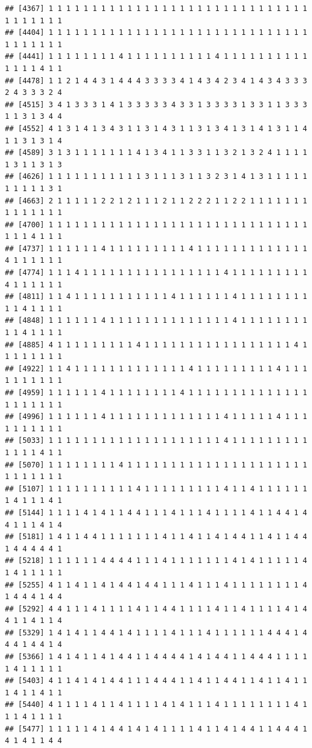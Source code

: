 \documentclass[
]{article}
\begin{document}
\begin{verbatim}
## [4367] 1 1 1 1 1 1 1 1 1 1 1 1 1 1 1 1 1 1 1 1 1 1 1 1 1 1 1 1 1 1 1 1 1 1 1 1 1
## [4404] 1 1 1 1 1 1 1 1 1 1 1 1 1 1 1 1 1 1 1 1 1 1 1 1 1 1 1 1 1 1 1 1 1 1 1 1 1
## [4441] 1 1 1 1 1 1 1 1 4 1 1 1 1 1 1 1 1 1 1 4 1 1 1 1 1 1 1 1 1 1 1 1 1 1 4 1 1
## [4478] 1 1 2 1 4 4 3 1 4 4 4 3 3 3 3 4 1 4 3 4 2 3 4 1 4 3 4 3 3 3 2 4 3 3 3 2 4
## [4515] 3 4 1 3 3 3 1 4 1 3 3 3 3 3 4 3 3 1 3 3 3 3 1 3 3 1 1 3 3 3 1 1 3 1 3 4 4
## [4552] 4 1 3 1 4 1 3 4 3 1 1 3 1 4 3 1 1 3 1 3 4 1 3 1 4 1 3 1 1 4 1 1 3 1 3 1 4
## [4589] 3 1 3 1 1 1 1 1 1 1 4 1 3 4 1 1 3 3 1 1 3 2 1 3 2 4 1 1 1 1 1 3 1 1 3 1 3
## [4626] 1 1 1 1 1 1 1 1 1 1 1 3 1 1 1 3 1 1 3 2 3 1 4 1 3 1 1 1 1 1 1 1 1 1 1 3 1
## [4663] 2 1 1 1 1 1 2 2 1 2 1 1 1 2 1 1 2 2 2 1 1 2 2 1 1 1 1 1 1 1 1 1 1 1 1 1 1
## [4700] 1 1 1 1 1 1 1 1 1 1 1 1 1 1 1 1 1 1 1 1 1 1 1 1 1 1 1 1 1 1 1 1 1 4 1 1 1
## [4737] 1 1 1 1 1 1 4 1 1 1 1 1 1 1 1 1 4 1 1 1 1 1 1 1 1 1 1 1 1 1 4 1 1 1 1 1 1
## [4774] 1 1 1 4 1 1 1 1 1 1 1 1 1 1 1 1 1 1 1 1 4 1 1 1 1 1 1 1 1 1 4 1 1 1 1 1 1
## [4811] 1 1 4 1 1 1 1 1 1 1 1 1 1 1 4 1 1 1 1 1 1 4 1 1 1 1 1 1 1 1 1 1 4 1 1 1 1
## [4848] 1 1 1 1 1 1 4 1 1 1 1 1 1 1 1 1 1 1 1 1 1 4 1 1 1 1 1 1 1 1 1 1 4 1 1 1 1
## [4885] 4 1 1 1 1 1 1 1 1 1 4 1 1 1 1 1 1 1 1 1 1 1 1 1 1 1 1 1 4 1 1 1 1 1 1 1 1
## [4922] 1 1 4 1 1 1 1 1 1 1 1 1 1 1 1 1 4 1 1 1 1 1 1 1 1 1 4 1 1 1 1 1 1 1 1 1 1
## [4959] 1 1 1 1 1 1 4 1 1 1 1 1 1 1 1 4 1 1 1 1 1 1 1 1 1 1 1 1 1 1 1 1 1 1 1 1 1
## [4996] 1 1 1 1 1 1 4 1 1 1 1 1 1 1 1 1 1 1 1 1 4 1 1 1 1 1 4 1 1 1 1 1 1 1 1 1 1
## [5033] 1 1 1 1 1 1 1 1 1 1 1 1 1 1 1 1 1 1 1 1 4 1 1 1 1 1 1 1 1 1 1 1 1 1 4 1 1
## [5070] 1 1 1 1 1 1 1 1 4 1 1 1 1 1 1 1 1 1 1 1 1 1 1 1 1 1 1 1 1 1 1 1 1 1 1 1 1
## [5107] 1 1 1 1 1 1 1 1 1 1 4 1 1 1 1 1 1 1 1 1 4 1 1 4 1 1 1 1 1 1 1 4 1 1 1 4 1
## [5144] 1 1 1 1 4 1 4 1 1 4 4 1 1 1 4 1 1 1 4 1 1 1 1 4 1 1 4 4 1 4 4 1 1 1 4 1 4
## [5181] 1 4 1 1 4 4 1 1 1 1 1 1 1 4 1 1 4 1 1 4 1 4 4 1 1 4 1 1 4 4 1 4 4 4 4 4 1
## [5218] 1 1 1 1 1 1 4 4 4 4 1 1 1 4 1 1 1 1 1 1 1 4 1 4 1 1 1 1 1 4 1 4 1 1 1 1 1
## [5255] 4 1 1 4 1 1 4 1 4 4 1 4 4 1 1 1 4 1 1 1 4 1 1 1 1 1 1 1 1 4 1 4 4 4 1 4 4
## [5292] 4 4 1 1 1 4 1 1 1 1 4 1 1 4 4 1 1 1 1 4 1 1 4 1 1 1 1 4 1 4 4 1 1 4 1 1 4
## [5329] 1 4 1 4 1 1 4 4 1 4 1 1 1 1 4 1 1 1 4 1 1 1 1 1 1 4 4 4 1 4 4 4 1 4 4 1 4
## [5366] 1 4 1 4 1 1 4 1 4 4 1 1 4 4 4 4 1 4 1 4 4 1 1 4 4 4 1 1 1 1 1 4 1 1 1 1 1
## [5403] 4 1 1 4 1 4 1 4 4 1 1 1 4 4 4 1 1 4 1 1 4 4 1 1 4 1 1 4 1 1 1 4 1 1 4 1 1
## [5440] 4 1 1 1 1 4 1 1 4 1 1 1 1 4 1 4 1 1 1 4 1 1 1 1 1 1 1 1 4 1 1 1 4 1 1 1 1
## [5477] 1 1 1 1 1 4 1 4 4 1 4 1 4 1 1 1 1 4 1 1 4 1 4 4 1 1 4 4 4 1 4 1 4 1 1 4 4

\end{verbatim}
\end{document}
